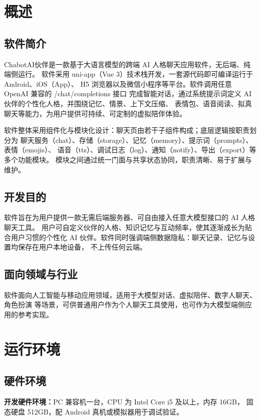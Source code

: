 \documentclass[zihao=5,a4paper]{ctexart}
\begin{document}
\section{概述}

\subsection{软件简介}
ChabotAI伙伴是一款基于大语言模型的跨端 AI 人格聊天应用软件，无后端、纯端侧运行。
软件采用 uni-app（Vue 3）技术栈开发，一套源代码即可编译运行于 Android、iOS（App）、
H5 浏览器以及微信小程序等平台。软件调用任意 OpenAI 兼容的 /chat/completions 接口
完成智能对话，通过系统提示词定义 AI 伙伴的个性化人格，并围绕记忆、情景、上下文压缩、
表情包、语音阅读、拟真聊天等能力，为用户提供可持续、可定制的虚拟陪伴体验。

软件整体采用组件化与模块化设计：聊天页由若干子组件构成；底层逻辑按职责划分为
聊天服务（chat）、存储（storage）、记忆（memory）、提示词（prompts）、表情（emojis）、
语音（tts）、调试日志（log）、通知（notify）、导出（export）等多个功能模块。
模块之间通过统一门面与共享状态协同，职责清晰、易于扩展与维护。

\subsection{开发目的}
软件旨在为用户提供一款无需后端服务器、可自由接入任意大模型接口的 AI 人格聊天工具。
用户可自定义伙伴的人格、知识记忆与互动频率，使其逐渐成长为贴合用户习惯的个性化
AI 伙伴。软件同时强调端侧数据隐私：聊天记录、记忆与设置均保存在用户本地设备，
不上传任何云端。

\subsection{面向领域与行业}
软件面向人工智能与移动应用领域，适用于大模型对话、虚拟陪伴、数字人聊天、角色扮演
等场景，可供普通用户作为个人聊天工具使用，也可作为大模型端侧应用的参考实现。

\section{运行环境}

\subsection{硬件环境}
\textbf{开发硬件环境：}PC 兼容机一台，CPU 为 Intel Core i5 及以上，内存 16GB，
固态硬盘 512GB，配 Android 真机或模拟器用于调试验证。
\end{document}

